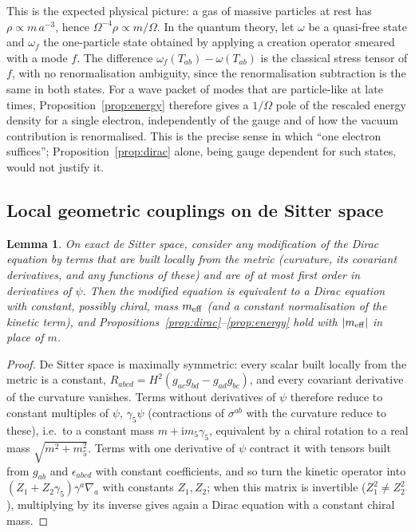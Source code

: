 \documentclass[11pt,a4paper]{article}
\newtheorem{lemma}{Lemma}
\theoremstyle{definition}
\newcommand{\ii}{\mathrm{i}}
\begin{document}
This is the expected physical picture: a gas of massive particles at rest has $\rho\propto m\,a^{-3}$, hence $\Omega^{-4}\rho\propto m/\Omega$. In the quantum theory, let $\omega$ be a quasi-free state and $\omega_{f}$ the one-particle state obtained by applying a creation operator smeared with a mode $f$. The difference $\omega_{f}(T_{ab})-\omega(T_{ab})$ is the classical stress tensor of $f$, with no renormalisation ambiguity, since the renormalisation subtraction is the same in both states. For a wave packet of modes that are particle-like at late times, Proposition~\ref{prop:energy} therefore gives a $1/\Omega$ pole of the rescaled energy density for a single electron, independently of the gauge and of how the vacuum contribution is renormalised. This is the precise sense in which ``one electron suffices''; Proposition~\ref{prop:dirac} alone, being gauge dependent for such states, would not justify it.

\subsection{Local geometric couplings on de Sitter space}
\label{sec:coupling}

\begin{lemma}
\label{lem:coupling}
On exact de Sitter space, consider any modification of the Dirac equation by terms that are built locally from the metric (curvature, its covariant derivatives, and any functions of these) and are of at most first order in derivatives of $\psi$. Then the modified equation is equivalent to a Dirac equation with constant, possibly chiral, mass $m_{\rm eff}$ (and a constant normalisation of the kinetic term), and Propositions~\ref{prop:dirac}--\ref{prop:energy} hold with $|m_{\rm eff}|$ in place of $m$.
\end{lemma}
\begin{proof}
De Sitter space is maximally symmetric: every scalar built locally from the metric is a constant, $R_{abcd}=H^{2}(g_{ac}g_{bd}-g_{ad}g_{bc})$, and every covariant derivative of the curvature vanishes. Terms without derivatives of $\psi$ therefore reduce to constant multiples of $\psi$, $\gamma_{5}\psi$ (contractions of $\sigma^{ab}$ with the curvature reduce to these), i.e.\ to a constant mass $m+\ii m_{5}\gamma_{5}$, equivalent by a chiral rotation to a real mass $\sqrt{m^{2}+m_{5}^{2}}$. Terms with one derivative of $\psi$ contract it with tensors built from $g_{ab}$ and $\epsilon_{abcd}$ with constant coefficients, and so turn the kinetic operator into $(Z_{1}+Z_{2}\gamma_{5})\gamma^{a}\nabla_{a}$ with constants $Z_{1},Z_{2}$; when this matrix is invertible ($Z_{1}^{2}\neq Z_{2}^{2}$), multiplying by its inverse gives again a Dirac equation with a constant chiral mass.
\end{proof}
\end{document}
